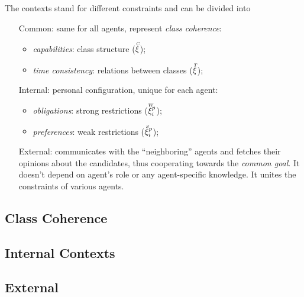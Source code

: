 \documentclass[../header]{subfiles}
\begin{document}

\noindent
The contexts stand for different constraints and can be divided into
\begin{itemize}[leftmargin=2cm]
  \item[Common:] same for all agents, represent \emph{class coherence}:
    \begin{itemize}
      \item \emph{capabilities}: class structure ($\accentset{C}{\xi}$);
      \item \emph{time consistency}: relations between classes ($\accentset{T}{\xi}$);
    \end{itemize}
  \item[Internal:] personal configuration, unique for each agent:
    \begin{itemize}
      \item \emph{obligations}: strong restrictions ($\accentset{W}{\xi}^p_i$);
      \item \emph{preferences}: weak restrictions ($\accentset{S}{\xi}^p_i$);
    \end{itemize}
  \item[External:] communicates with the ``neighboring'' agents and fetches
    their opinions about the candidates, thus cooperating towards the
    \emph{common goal}. It doesn't depend on agent's role or
      any agent-specific knowledge. It unites the constraints of various agents.
\end{itemize}


\subsection{Class Coherence}

\subsection{Internal Contexts}

\subsection{External}

\end{document}
